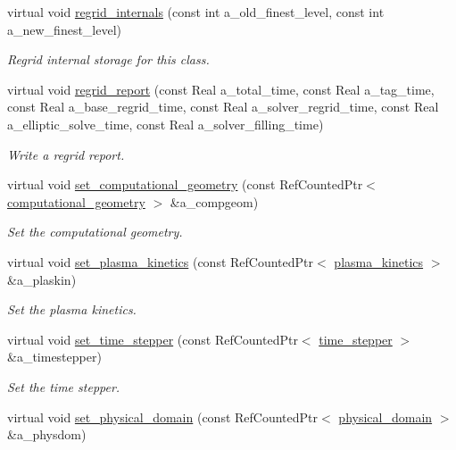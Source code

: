 \begin{DoxyCompactItemize}
virtual void \hyperlink{classplasma__engine_af339c842a8be34680c7688136654c72b}{regrid\+\_\+internals} (const int a\+\_\+old\+\_\+finest\+\_\+level, const int a\+\_\+new\+\_\+finest\+\_\+level)
\begin{DoxyCompactList}\small\item\em Regrid internal storage for this class. \end{DoxyCompactList}\item 
virtual void \hyperlink{classplasma__engine_aa74f36a5bf45f2fd794178387ab08c09}{regrid\+\_\+report} (const Real a\+\_\+total\+\_\+time, const Real a\+\_\+tag\+\_\+time, const Real a\+\_\+base\+\_\+regrid\+\_\+time, const Real a\+\_\+solver\+\_\+regrid\+\_\+time, const Real a\+\_\+elliptic\+\_\+solve\+\_\+time, const Real a\+\_\+solver\+\_\+filling\+\_\+time)
\begin{DoxyCompactList}\small\item\em Write a regrid report. \end{DoxyCompactList}\item 
virtual void \hyperlink{classplasma__engine_ab4e2910083762bc6df65d874cd58a755}{set\+\_\+computational\+\_\+geometry} (const Ref\+Counted\+Ptr$<$ \hyperlink{classcomputational__geometry}{computational\+\_\+geometry} $>$ \&a\+\_\+compgeom)
\begin{DoxyCompactList}\small\item\em Set the computational geometry. \end{DoxyCompactList}\item 
virtual void \hyperlink{classplasma__engine_a1f719ebc774758c4711ea60c0bf0e96a}{set\+\_\+plasma\+\_\+kinetics} (const Ref\+Counted\+Ptr$<$ \hyperlink{classplasma__kinetics}{plasma\+\_\+kinetics} $>$ \&a\+\_\+plaskin)
\begin{DoxyCompactList}\small\item\em Set the plasma kinetics. \end{DoxyCompactList}\item 
virtual void \hyperlink{classplasma__engine_a9ff9d0097866de39efbca5a73d60f890}{set\+\_\+time\+\_\+stepper} (const Ref\+Counted\+Ptr$<$ \hyperlink{classtime__stepper}{time\+\_\+stepper} $>$ \&a\+\_\+timestepper)
\begin{DoxyCompactList}\small\item\em Set the time stepper. \end{DoxyCompactList}\item 
virtual void \hyperlink{classplasma__engine_ad9bb2d32b6dadde3d3721a0c47144e9b}{set\+\_\+physical\+\_\+domain} (const Ref\+Counted\+Ptr$<$ \hyperlink{classphysical__domain}{physical\+\_\+domain} $>$ \&a\+\_\+physdom)

\end{DoxyCompactItemize}
